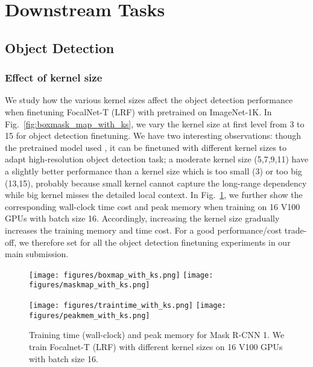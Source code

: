 \documentclass{article}
\begin{document}
\section{Downstream Tasks}
\subsection{Object Detection}
\subsubsection{Effect of kernel size} 
We study how the various kernel sizes affect the object detection performance when finetuning FocalNet-T (LRF) with  pretrained on ImageNet-1K. In Fig.~\ref{fig:boxmask_map_with_ks}, we vary the kernel size at first level  from 3 to 15 for object detection finetuning. 
We have two interesting observations:  though the pretrained model used , it can be finetuned with different kernel sizes to adapt high-resolution object detection task;  a moderate kernel size (5,7,9,11) have a slightly better performance than a kernel size which is too small (3) or too big (13,15), probably because small kernel cannot capture the long-range dependency while big kernel misses the detailed local context. In Fig.~\ref{fig:time_mem_with_ks}, we further show the corresponding wall-clock time cost and peak memory when training on 16 V100 GPUs with batch size 16. Accordingly, increasing the kernel size gradually increases the training memory and time cost. For a good performance/cost trade-off, we therefore set  for all the object detection finetuning experiments in our main submission.

\begin{figure}[t]
\begin{minipage}{0.48\linewidth}
	\centering
	\texttt{[image: figures/boxmap\_with\_ks.png]}
	\texttt{[image: figures/maskmap\_with\_ks.png]}	
	\vspace{-5mm}
    \captionsetup{font=scriptsize}    
    \caption{Box and mask mAP for Mask R-CNN 1 training. We use FocalNet-T (LRF) as the baseline model and vary its kernel size at first level .}
    \vspace{-3mm}
    \label{fig:boxmask_map_with_ks}	
\end{minipage}
\quad
\begin{minipage}{0.48\linewidth}
	\centering
	\texttt{[image: figures/traintime\_with\_ks.png]}
	\texttt{[image: figures/peakmem\_with\_ks.png]}	
	\vspace{-5mm}
    \captionsetup{font=scriptsize}    
    \caption{Training time (wall-clock) and peak memory for Mask R-CNN 1. We train Focalnet-T (LRF) with different kernel sizes on 16 V100 GPUs with batch size 16.}
    \vspace{-3mm}
    \label{fig:time_mem_with_ks}	
\end{minipage}
\end{figure}
\end{document}
